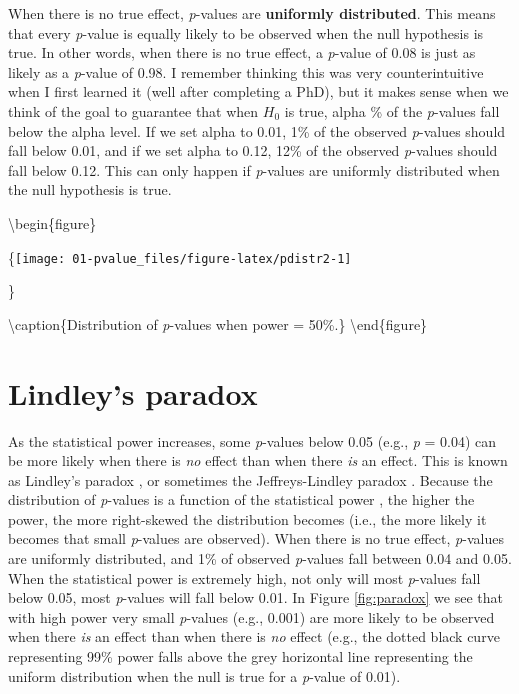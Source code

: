 \documentclass[
  oneside]{book}
\begin{document}
When there is no true effect, \emph{p}-values are \textbf{uniformly distributed}. This means that every \emph{p}-value is equally likely to be observed when the null hypothesis is true. In other words, when there is no true effect, a \emph{p}-value of 0.08 is just as likely as a \emph{p}-value of 0.98. I remember thinking this was very counterintuitive when I first learned it (well after completing a PhD), but it makes sense when we think of the goal to guarantee that when \(H_0\) is true, alpha \% of the \emph{p}-values fall below the alpha level. If we set alpha to 0.01, 1\% of the observed \emph{p}-values should fall below 0.01, and if we set alpha to 0.12, 12\% of the observed \emph{p}-values should fall below 0.12. This can only happen if \emph{p}-values are uniformly distributed when the null hypothesis is true.

\textbackslash begin\{figure\}

\{\centering \texttt{[image: 01-pvalue\_files/figure-latex/pdistr2-1]}

\}

\textbackslash caption\{Distribution of \emph{p}-values when power = 50\%.\}\label{fig:pdistr2}
\textbackslash end\{figure\}

\hypertarget{lindley}{%
\section{Lindley's paradox}\label{lindley}}

As the statistical power increases, some \emph{p}-values below 0.05 (e.g., \emph{p} = 0.04) can be more likely when there is \emph{no} effect than when there \emph{is} an effect. This is known as Lindley's paradox \citep{lindley_statistical_1957}, or sometimes the Jeffreys-Lindley paradox \citep{spanos_who_2013}. Because the distribution of \emph{p}-values is a function of the statistical power \citep{cumming_replication_2008}, the higher the power, the more right-skewed the distribution becomes (i.e., the more likely it becomes that small \emph{p}-values are observed). When there is no true effect, \emph{p}-values are uniformly distributed, and 1\% of observed \emph{p}-values fall between 0.04 and 0.05. When the statistical power is extremely high, not only will most \emph{p}-values fall below 0.05, most \emph{p}-values will fall below 0.01. In Figure \ref{fig:paradox} we see that with high power very small \emph{p}-values (e.g., 0.001) are more likely to be observed when there \emph{is} an effect than when there is \emph{no} effect (e.g., the dotted black curve representing 99\% power falls above the grey horizontal line representing the uniform distribution when the null is true for a \emph{p}-value of 0.01).
\end{document}
